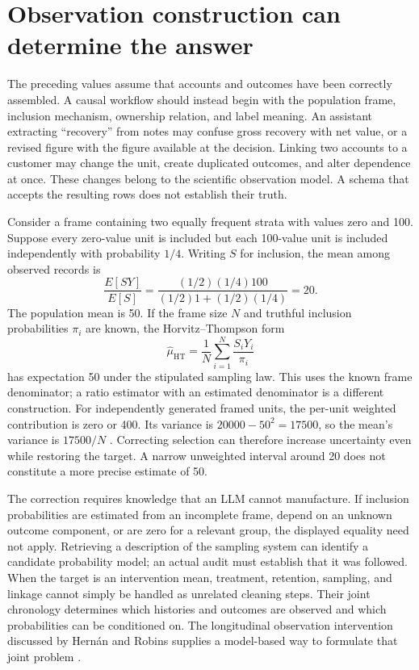 \section{Observation construction can determine the answer}
\label{exec14:l5-observations}

The preceding values assume that accounts and outcomes have been correctly
assembled. A causal workflow should instead begin with the population frame,
inclusion mechanism, ownership relation, and label meaning. An assistant
extracting ``recovery'' from notes may confuse gross recovery with net value,
or a revised figure with the figure available at the decision. Linking two
accounts to a customer may change the unit, create duplicated outcomes, and
alter dependence at once. These changes belong to the scientific observation
model. A schema that accepts the resulting rows does not establish their truth.

Consider a frame containing two equally frequent strata with values zero and
100. Suppose every zero-value unit is included but each 100-value unit is
included independently with probability $1/4$. Writing $S$ for inclusion,
the mean among observed records is
\[
 \frac{E[SY]}{E[S]}=
 \frac{(1/2)(1/4)100}{(1/2)1+(1/2)(1/4)}=20.
\]
The population mean is 50. If the frame size $N$ and truthful inclusion
probabilities $\pi_i$ are known, the Horvitz--Thompson form
\[
 \widehat\mu_{\mathrm{HT}}=
 \frac1N\sum_{i=1}^N\frac{S_iY_i}{\pi_i}
\]
has expectation 50 under the stipulated sampling law. This uses the known
frame denominator; a ratio estimator with an estimated denominator is a
different construction. For independently generated framed units, the
per-unit weighted contribution is zero or 400. Its variance is
$20000-50^2=17500$, so the mean's variance is $17500/N$
\citep{exec14_workflow_oracle}. Correcting selection can therefore increase
uncertainty even while restoring the target. A narrow unweighted interval
around 20 does not constitute a more precise estimate of 50.

The correction requires knowledge that an LLM cannot manufacture. If inclusion
probabilities are estimated from an incomplete frame, depend on an unknown
outcome component, or are zero for a relevant group, the displayed equality
need not apply. Retrieving a description of the sampling system can identify
a candidate probability model; an actual audit must establish that it was
followed. When the target is an intervention mean, treatment, retention,
sampling, and linkage cannot simply be handled as unrelated cleaning steps.
Their joint chronology determines which histories and outcomes are observed
and which probabilities can be conditioned on. The longitudinal observation
intervention discussed by Hern\'an and Robins supplies a model-based way to
formulate that joint problem \citep{hernan2020}.

